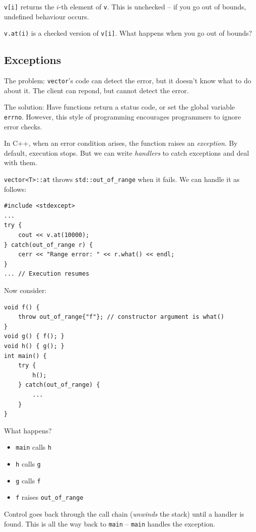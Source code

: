 \documentclass[11pt]{article}
\theoremstyle{definition}
\begin{document}
{\tt v[i]} returns the $i$-th element of {\tt v}. This is unchecked -- if you go out of bounds, undefined behaviour occurs.

{\tt v.at(i)} is a checked version of {\tt v[i]}. What happens when you go out of bounds?

\subsection{Exceptions}
The problem: {\tt vector}'s code can detect the error, but it doesn't know what to do about it. The client can repond, but cannot detect the error.

The solution: Have functions return a status code, or set the global variable {\tt errno}. However, this style of programming encourages programmers to ignore error checks.

In C++, when an error condition arises, the function raises an {\it exception}. By default, execution stops. But we can write {\it handlers} to catch exceptions and deal with them.

{\tt vector<T>::at} throws {\tt std::out\_of\_range} when it fails. We can handle it as follows:
\begin{lstlisting}
#include <stdexcept>
...
try {
    cout << v.at(10000);
} catch(out_of_range r) {
    cerr << "Range error: " << r.what() << endl;
}
... // Execution resumes
\end{lstlisting}
\vspace{-0.25cm}
Now consider:
\begin{lstlisting}
void f() {
    throw out_of_range{"f"}; // constructor argument is what()
}
void g() { f(); }
void h() { g(); }
int main() {
    try {
        h();
    } catch(out_of_range) {
        ...
    }
}
\end{lstlisting}
\vspace{-0.25cm}
What happens?\vspace{-0.25cm}
\begin{itemize}[\label{}]
\item {\tt main} calls {\tt h}\vspace{-0.25cm}
\item {\tt h} calls {\tt g}\vspace{-0.25cm}
\item {\tt g} calls {\tt f}\vspace{-0.25cm}
\item {\tt f} raises {\tt out\_of\_range}
\end{itemize}
\vspace{-0.25cm}
Control goes back through the call chain ({\it unwinds} the stack) until a handler is found. This is all the way back to {\tt main} -- {\tt main} handles the exception.
\end{document}
